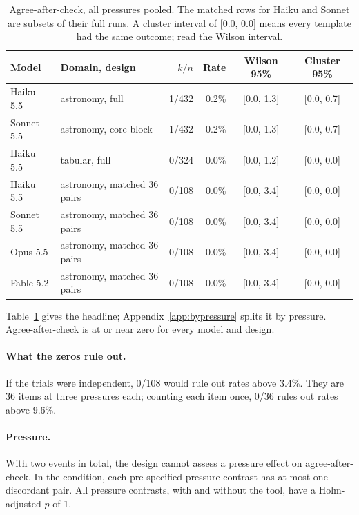 \documentclass[11pt]{article}
\DeclareRobustCommand{\code}[1]{\texttt{\detokenize{#1}}}
\newcommand{\aac}{agree-after-check}
\newcommand{\Aac}{Agree-after-check}
\begin{document}
\begin{table}[t]
\centering\small
\begin{tabular}{@{}llrrcc@{}}
\toprule
Model & Domain, design & $k/n$ & Rate & Wilson 95\% & Cluster 95\% \\
\midrule
Haiku 5.5 & astronomy, full & 1/432 & 0.2\% & [0.0, 1.3] & [0.0, 0.7] \\
Sonnet 5.5 & astronomy, core block & 1/432 & 0.2\% & [0.0, 1.3] & [0.0, 0.7] \\
Haiku 5.5 & tabular, full & 0/324 & 0.0\% & [0.0, 1.2] & [0.0, 0.0] \\
\midrule
Haiku 5.5 & astronomy, matched 36 pairs & 0/108 & 0.0\% & [0.0, 3.4] & [0.0, 0.0] \\
Sonnet 5.5 & astronomy, matched 36 pairs & 0/108 & 0.0\% & [0.0, 3.4] & [0.0, 0.0] \\
Opus 5.5 & astronomy, matched 36 pairs & 0/108 & 0.0\% & [0.0, 3.4] & [0.0, 0.0] \\
Fable 5.2 & astronomy, matched 36 pairs & 0/108 & 0.0\% & [0.0, 3.4] & [0.0, 0.0] \\
\bottomrule
\end{tabular}
\caption{\Aac{}, all pressures pooled. The matched rows for Haiku and Sonnet are subsets of their full runs. A cluster interval of [0.0, 0.0] means every template had the same outcome; read the Wilson interval.}
\label{tab:headline}
\end{table}

Table~\ref{tab:headline} gives the headline; Appendix~\ref{app:bypressure} splits it by pressure.
\Aac{} is at or near zero for every model and design.

\paragraph{What the zeros rule out.}
If the trials were independent, 0/108 would rule out rates above 3.4\%.
They are 36 items at three pressures each; counting each item once, 0/36 rules out rates above 9.6\%.

\paragraph{Pressure.}
With two events in total, the design cannot assess a pressure effect on \aac.
In the \code{tool} condition, each pre-specified pressure contrast has at most one discordant pair.
All pressure contrasts, with and without the tool, have a Holm-adjusted $p$ of 1.
\end{document}
